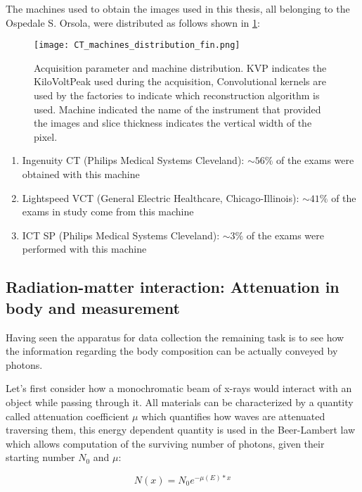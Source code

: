 The machines used to obtain the images used in this thesis, all belonging to the Ospedale S. Orsola, were distributed as follows shown in \ref{fig:ct_dist}:


\begin{figure}[H]
\centering
  		\texttt{[image: CT\_machines\_distribution\_fin.png]}
        \caption{Acquisition parameter and machine distribution. KVP indicates the KiloVoltPeak used during the acquisition, Convolutional kernels are used by the factories to indicate which reconstruction algorithm is used. Machine indicated the name of the instrument that provided the images and slice thickness indicates the vertical width of the pixel.\label{fig:ct_dist}}
\end{figure}

\begin{enumerate}
\item Ingenuity CT  (Philips Medical Systems Cleveland):  $\sim 56\%$ of the exams were obtained with this machine
\item Lightspeed VCT  (General Electric Healthcare, Chicago-Illinois): $\sim 41\%$ of the exams in study come from this machine
\item ICT SP (Philips Medical Systems Cleveland):  $\sim 3\%$ of the exams were performed with this machine
\end{enumerate}

\subsection{Radiation-matter interaction: Attenuation in body and measurement}
Having seen the apparatus for data collection the remaining task is to see how the information regarding the body composition can be actually conveyed by photons.

Let's first consider how a monochromatic beam of x-rays would interact with an object while passing through it. All materials can be characterized by a quantity called attenuation coefficient $\mu$ which quantifies how waves are attenuated traversing them, this energy dependent quantity is used in the Beer-Lambert law which allows computation of the surviving number of photons, given their starting number $N_0$ and $\mu$:

\begin{equation}
N(x) = N_0e^{-\mu(E)*x}
\label{Beer-Lambert}
\end{equation}

